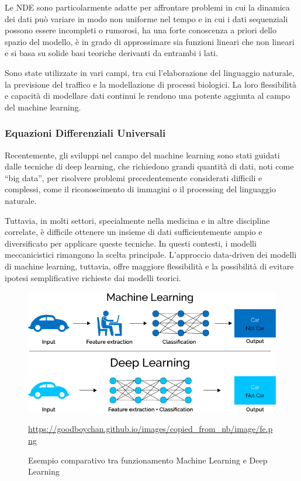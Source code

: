 Le NDE sono particolarmente adatte per affrontare problemi in cui la dinamica dei dati può variare in modo non uniforme nel tempo e in cui i dati sequenziali possono essere incompleti o rumorosi, ha una forte conoscenza a priori 
dello spazio del modello, è in grado di approssimare sia funzioni 
lineari che non lineari e si basa su solide basi teoriche derivanti da 
entrambi i lati. 

Sono state utilizzate in vari campi, tra cui l'elaborazione del linguaggio naturale, la previsione del traffico e la modellazione di processi biologici. La loro flessibilità e capacità di modellare dati continui le rendono una potente aggiunta al campo del machine learning.
\newpage

\subsubsection{Equazioni Differenziali Universali}

Recentemente, gli sviluppi nel campo del machine learning sono stati 
guidati dalle tecniche di deep learning, che richiedono grandi quantità 
di dati, noti come ``big data'', per risolvere problemi precedentemente 
considerati difficili e complessi, come il riconoscimento di immagini o 
il processing del linguaggio naturale.

Tuttavia, in molti settori, specialmente nella medicina e in altre 
discipline correlate, è difficile ottenere un insieme di dati 
sufficientemente ampio e diversificato per applicare queste tecniche. 
In questi contesti, i modelli meccanicistici rimangono la scelta 
principale. L'approccio data-driven dei modelli di machine learning, 
tuttavia, offre maggiore flessibilità e la possibilità di evitare 
ipotesi semplificative richieste dai modelli teorici.

\begin{figure}[H]
    \begin{center}
        \includegraphics[scale=0.4]{img/Caratteristiche-e-funzionamento-del-Deep-Learning-in-informatica.png}
        \caption{Esempio comparativo tra funzionamento Machine Learning e Deep Learning}
        \url{https://goodboychan.github.io/images/copied_from_nb/image/fe.png}
        \label{fig:ml_dl_example}
    \end{center}
\end{figure}

